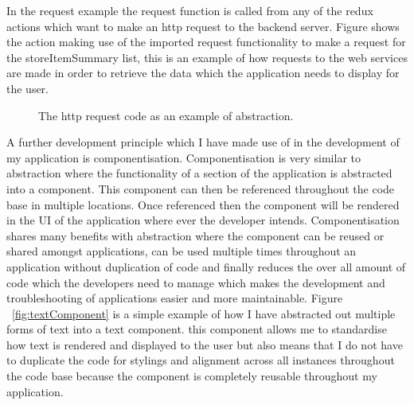 \documentclass[a4paper,11pt]{report}
\begin{document}
In the request example the request function is called from any of the redux actions which want to make an http request to the
backend server. Figure  shows the action making use of the imported request functionality to make a request 
for the storeItemSummary list, this is an example of how requests to the web services are made in order to retrieve the data which the application
needs to display for the user.

\begin{figure}[H]
    \centering
    \caption{The http request code as an example of abstraction.}
    \label{fig:actionExample}
    \end{figure}

A further development principle which I have made use of in the development of my application is componentisation. Componentisation is very similar to abstraction where the functionality of a section of the application is abstracted into a component. This component can then be referenced throughout the code base in multiple locations. Once referenced then the component will be rendered in the UI of the application where ever the developer intends. Componentisation shares many benefits with abstraction where the component can be reused or shared amongst applications, can be used multiple times throughout an application without duplication of code and finally reduces the over all amount of code which the developers need to manage which makes the development and troubleshooting of applications easier and more maintainable. 
Figure ~\ref{fig:textComponent} is a simple example of how I have abstracted out multiple forms of text into a text component. this component allows me to standardise how text is rendered and displayed to the user but also means that I do not have to duplicate the code for stylings and alignment across all instances throughout the code base because the component is completely reusable throughout my application.
\end{document}
